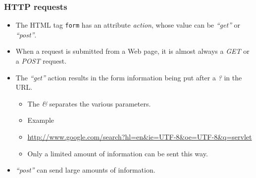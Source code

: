 \documentclass[10pt,xcolor=pdflatex]{beamer}
\begin{document}
\begin{frame}[containsverbatim]\frametitle{HTTP requests}
	\begin{itemize}
		\item The HTML \emph{} tag \texttt{form} has an attribute \emph{action}, whose value can be \emph{``get''} or \emph{``post''}.
        \item When a request is submitted from a Web page, it is almost always a \emph{GET} or a \emph{POST} request.
       	\item The \emph{``get''} action results in the form information being put after a  \emph{?} in the URL.
		  \begin{itemize}
            \item The \emph{\&} separates the various parameters.
            \item Example
            \item[] \url{http://www.google.com/search?hl=en&ie=UTF-8&oe=UTF-8&q=servlet}			  \item Only a limited amount of information can be sent this way.
          \end{itemize}
        \item \emph{``post''} can send large amounts of information.
    \end{itemize}
\end{frame}
\end{document}
